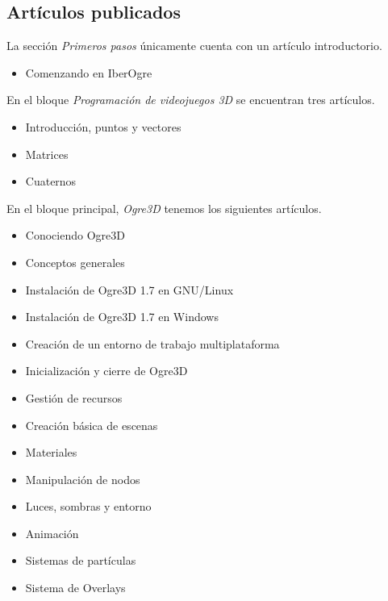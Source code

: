 \documentclass[a4paper,11pt]{article}
\begin{document}

\subsection{Artículos publicados} 

\noindent La sección \textit{Primeros pasos} únicamente cuenta con un artículo
introductorio.

\begin{itemize}
    \itemsep0em
    \item Comenzando en IberOgre
\end{itemize}

\noindent En el bloque \textit{Programación de videojuegos 3D} se encuentran tres
artículos.

\begin{itemize}
    \itemsep0em
    \item Introducción, puntos y vectores
    \item Matrices
    \item Cuaternos
\end{itemize}

\noindent En el bloque principal, \textit{Ogre3D} tenemos los siguientes artículos.

\begin{itemize}
    \itemsep0em
    \item Conociendo Ogre3D
    \item Conceptos generales
    \item Instalación de Ogre3D 1.7 en GNU/Linux
    \item Instalación de Ogre3D 1.7 en Windows
    \item Creación de un entorno de trabajo multiplataforma
    \item Inicialización y cierre de Ogre3D
    \item Gestión de recursos
    \item Creación básica de escenas
    \item Materiales
    \item Manipulación de nodos
    \item Luces, sombras y entorno
    \item Animación
    \item Sistemas de partículas
    \item Sistema de Overlays
\end{itemize}
\end{document}
